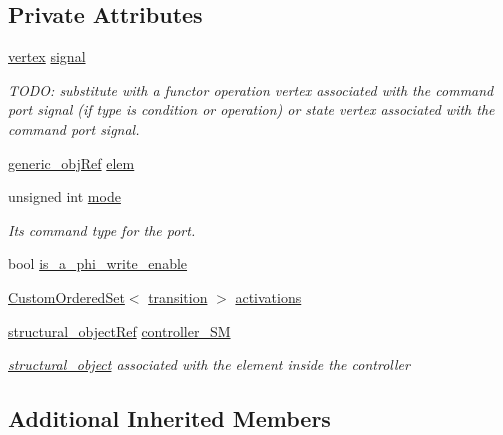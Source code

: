 \subsection*{Private Attributes}
\begin{DoxyCompactItemize}
\item 
\hyperlink{graph_8hpp_abefdcf0544e601805af44eca032cca14}{vertex} \hyperlink{classcommandport__obj_ac538468677e17a5d6692e9a05ecc58fc}{signal}
\begin{DoxyCompactList}\small\item\em T\+O\+DO\+: substitute with a functor operation vertex associated with the command port signal (if type is condition or operation) or state vertex associated with the command port signal. \end{DoxyCompactList}\item 
\hyperlink{generic__obj_8hpp_acb533b2ef8e0fe72e09a04d20904ca81}{generic\+\_\+obj\+Ref} \hyperlink{classcommandport__obj_af40c778f133bfc50cd03633da1da2457}{elem}
\item 
unsigned int \hyperlink{classcommandport__obj_aabeb96a9f2bde943f4fe1a396c9af7eb}{mode}
\begin{DoxyCompactList}\small\item\em It\textquotesingle{}s command type for the port. \end{DoxyCompactList}\item 
bool \hyperlink{classcommandport__obj_a8d4afc69efc8cb93baf1fc619f539074}{is\+\_\+a\+\_\+phi\+\_\+write\+\_\+enable}
\item 
\hyperlink{classCustomOrderedSet}{Custom\+Ordered\+Set}$<$ \hyperlink{classcommandport__obj_aae52b929cff6d84d461b91d88baa3203}{transition} $>$ \hyperlink{classcommandport__obj_adb662a06af834f7d81165f47283353a1}{activations}
\item 
\hyperlink{structural__objects_8hpp_a8ea5f8cc50ab8f4c31e2751074ff60b2}{structural\+\_\+object\+Ref} \hyperlink{classcommandport__obj_a9aec5239255143976852aedfafaa12c6}{controller\+\_\+\+SM}
\begin{DoxyCompactList}\small\item\em \hyperlink{classstructural__object}{structural\+\_\+object} associated with the element inside the controller \end{DoxyCompactList}\end{DoxyCompactItemize}
\subsection*{Additional Inherited Members}


